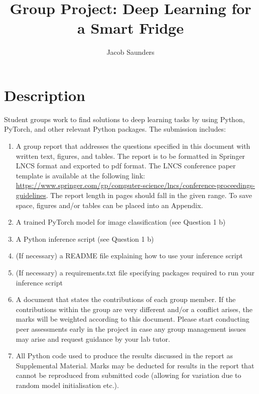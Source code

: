 \documentclass[runningheads]{llncs}
\begin{document}
\title{Group Project: Deep Learning for a Smart Fridge}
\author{Jacob Saunders}


\maketitle

\section*{Description}

\noindent Student groups work to ﬁnd solutions to deep learning tasks by using Python, PyTorch, and other relevant Python packages. The submission includes:

\begin{enumerate}
    \item A group report that addresses the questions speciﬁed in this document with written text, ﬁgures, and tables. The report is to be formatted in Springer LNCS format and exported to pdf format. The LNCS conference paper template is available at the following link: \url{https://www.springer.com/gp/computer-science/lncs/conference-proceedings-guidelines}. The report length in pages should fall in the given range. To save space, ﬁgures and/or tables can be placed into an Appendix.
    \item A trained PyTorch model for image classification (see Question 1 b)
    \item A Python inference script (see Question 1 b)
    \item (If necessary) a README ﬁle explaining how to use your inference script
    \item (If necessary) a requirements.txt ﬁle specifying packages required to run your inference script
    \item A document that states the contributions of each group member. If the contributions within the group are very diﬀerent and/or a conﬂict arises, the marks will be weighted according to this document. Please start conducting peer assessments early in the project in case any group management issues may arise and request guidance by your lab tutor.
    \item All Python code used to produce the results discussed in the report as Supplemental Material. Marks may be deducted for results in the report that cannot be reproduced from submitted code (allowing for variation due to random model initialisation etc.).
\end{enumerate}
\end{document}
